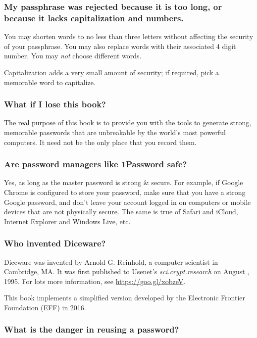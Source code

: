\subsubsection{My passphrase was rejected because it is too long, or because it lacks capitalization and numbers.}

You may shorten words to no less than three letters without affecting the security of your passphrase. You may also replace words with their associated 4 digit number. You may \textit{not} choose different words.

Capitalization adds a very small amount of security; if required, pick a memorable word to capitalize.

\subsubsection{What if I lose this book?}

The real purpose of this book is to provide you with the tools to generate strong, memorable passwords that are unbreakable by the world's most powerful computers. It need not be the only place that you record them.

\subsubsection{Are password managers like 1Password safe?}

Yes, as long as the master password is strong \& secure. For example, if Google Chrome is configured to store your password, make sure that you have a strong Google password, and don't leave your account logged in on computers or mobile devices that are not physically secure. The same is true of Safari and iCloud, Internet Explorer and Windows Live, etc.

\subsubsection{Who invented Diceware?}

Diceware was invented by Arnold G. Reinhold, a computer scientist in Cambridge, MA. It was first published to Usenet's \textit{sci.crypt.research} on August , 1995. For lots more information, see 
\url{https://goo.gl/xobzeV}.

This book implements a simplified version developed by the Electronic Frontier Foundation (EFF) in 2016.
 
\subsubsection{What is the danger in reusing a password?}

